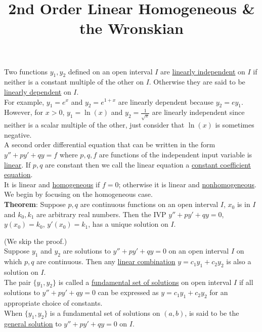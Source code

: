\documentclass{ximera}
\begin{document}
\begin{abstract}
 \end{abstract}

    \title{2nd Order Linear Homogeneous \& the Wronskian}
    
    \maketitle


 Two functions $y_{1},y_{2}$ defined on an open interval $I$ are \underline{linearly independent} on $I$ if neither is a constant multiple of the other on $I$.   Otherwise they are said to be \underline{linearly dependent} on $I$.\\

 For example, $y_1=e^x$ and $y_2=e^{1+x}$ are linearly dependent because $y_2=ey_1$.   However, for $x>0$, $y_1=\ln{(x)}$ and $y_2=\frac{1}{\sqrt{x}}$ are linearly independent since neither is a scalar multiple of the other, just consider that $\ln{(x)}$ is sometimes negative.\\


 A second order differential equation that can be written in the form $y''+py'+qy=f$ where $p,q,f$ are functions of the independent input variable is  \underline{linear}.  If $p,q$ are constant then we call the linear equation a \underline{constant coefficient equation}.\\

 It is linear and \underline{homogeneous} if $f=0$;  otherwise it is linear and \underline{nonhomogeneous}.  We begin by focusing on the homogeneous case.\\

 \textbf{Theorem}:  Suppose $p,q$ are continuous functions on an open interval $I$, $x_{0}$ is in $I$ and $k_{0},k_{1}$ are arbitrary real numbers.  Then the IVP $y''+py'+qy=0$, $y(x_{0})=k_{0}$, $y'(x_{0})=k_{1}$, has a unique solution on $I$.

 (We skip the proof.)\\

 Suppose $y_{1}$ and $y_{2}$ are solutions to $y''+py'+qy=0$ on an open interval $I$ on which $p,q$ are continuous.   Then any \underline{linear combination} $y=c_{1}y_{1}+c_{2}y_{2}$ is also a solution on $I$.\\


 The pair $\{y_{1},y_{2}\}$ is called a \underline{fundamental set of solutions} on open interval $I$ if all solutions to $y''+py'+qy=0$ can be expressed as $y=c_{1}y_{1}+c_{2}y_{2}$ for an appropriate choice of constants.\\  When $\{y_{1},y_{2}\}$ is a fundamental set of solutions on $(a,b)$,  is said to be the \underline{general solution} to $y''+py'+qy=0$ on $I$.\\ \\
\end{document}
